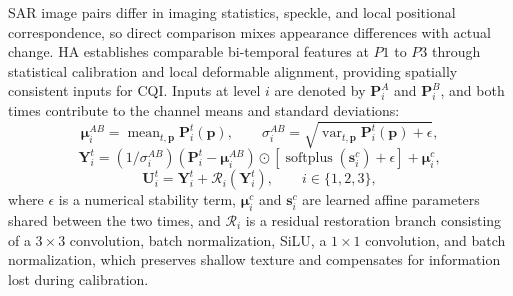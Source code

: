 \documentclass[authoryear,preprint,12pt]{elsarticle}
\begin{document}
SAR image pairs differ in imaging statistics, speckle, and local positional correspondence, so direct comparison mixes appearance differences with actual change. HA establishes comparable bi-temporal features at \(P1\) to \(P3\) through statistical calibration and local deformable alignment, providing spatially consistent inputs for CQI. Inputs at level \(i\) are denoted by \(\mathbf P_i^A\) and \(\mathbf P_i^B\), and both times contribute to the channel means and standard deviations:
\begin{equation}\label{eq:ha_calibration}
 \boldsymbol\mu_i^{AB}=\operatorname{mean}_{t,\mathbf p}\mathbf P_i^t(\mathbf p),\qquad
 \sigma_i^{AB}=\sqrt{\operatorname{var}_{t,\mathbf p}\mathbf P_i^t(\mathbf p)+\epsilon},
\end{equation}
\begin{equation}\label{eq:ha_affine}
 \mathbf Y_i^t=(1/\sigma_i^{AB})(\mathbf P_i^t-\boldsymbol\mu_i^{AB})\odot
 [\operatorname{softplus}(\mathbf s_i^c)+\epsilon]+\boldsymbol\mu_i^c,
\end{equation}
\begin{equation}\label{eq:ha_recovery}
 \mathbf U_i^t=\mathbf Y_i^t+\mathcal{R}_i(\mathbf Y_i^t),
 \qquad i\in\{1,2,3\},
\end{equation}
where \(\epsilon\) is a numerical stability term, \(\boldsymbol\mu_i^c\) and \(\mathbf s_i^c\) are learned affine parameters shared between the two times, and \(\mathcal R_i\) is a residual restoration branch consisting of a \(3\times3\) convolution, batch normalization, SiLU, a \(1\times1\) convolution, and batch normalization, which preserves shallow texture and compensates for information lost during calibration.
\end{document}
